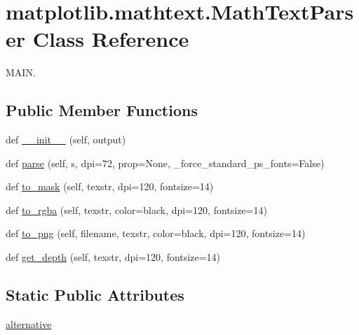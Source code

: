 \hypertarget{classmatplotlib_1_1mathtext_1_1MathTextParser}{}\section{matplotlib.\+mathtext.\+Math\+Text\+Parser Class Reference}
\label{classmatplotlib_1_1mathtext_1_1MathTextParser}


M\+A\+IN.  


\subsection*{Public Member Functions}
\begin{DoxyCompactItemize}
\item 
def \hyperlink{classmatplotlib_1_1mathtext_1_1MathTextParser_abe3c427a9a7981444ced6ca83b4f0fde}{\+\_\+\+\_\+init\+\_\+\+\_\+} (self, output)
\item 
def \hyperlink{classmatplotlib_1_1mathtext_1_1MathTextParser_a9abf5e81b0c41d431d630a53ea324624}{parse} (self, s, dpi=72, prop=None, \+\_\+force\+\_\+standard\+\_\+ps\+\_\+fonts=False)
\item 
def \hyperlink{classmatplotlib_1_1mathtext_1_1MathTextParser_a2ab905102ebba2a55f889b195ab8c068}{to\+\_\+mask} (self, texstr, dpi=120, fontsize=14)
\item 
def \hyperlink{classmatplotlib_1_1mathtext_1_1MathTextParser_ab3fccc3a3709a88886947191ce71e0ec}{to\+\_\+rgba} (self, texstr, color=\textquotesingle{}black\textquotesingle{}, dpi=120, fontsize=14)
\item 
def \hyperlink{classmatplotlib_1_1mathtext_1_1MathTextParser_a6cfd30112a8b16bf7eabd4d8ae388b98}{to\+\_\+png} (self, filename, texstr, color=\textquotesingle{}black\textquotesingle{}, dpi=120, fontsize=14)
\item 
def \hyperlink{classmatplotlib_1_1mathtext_1_1MathTextParser_a29fdbc0a51fac1868ee72093938f1e59}{get\+\_\+depth} (self, texstr, dpi=120, fontsize=14)
\end{DoxyCompactItemize}
\subsection*{Static Public Attributes}
\begin{DoxyCompactItemize}
\item 
\hyperlink{classmatplotlib_1_1mathtext_1_1MathTextParser_a26ef0cd7ccce3713347d9cc9c8a4a8ff}{alternative}
\end{DoxyCompactItemize}


